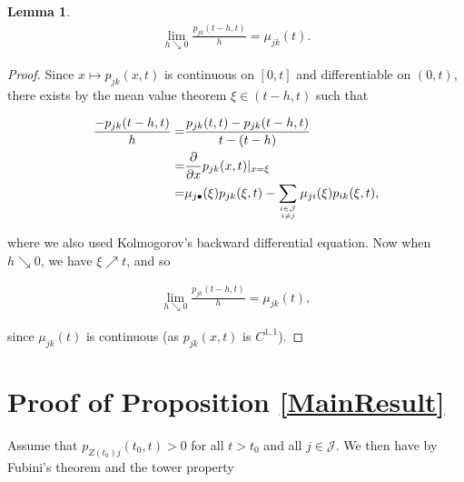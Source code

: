 \documentclass{article}
\newcommand{\1}[1]{\mathbbm{1}_{\left\lbrace #1 \right\rbrace}}
\theoremstyle{break}
\newtheorem{lemma}[definition]{Lemma}
\theoremstyle{remark}
\numberwithin{equation}{section}
\begin{document}
\begin{appendices}
\begin{lemma}
	\begin{align*}
		\lim_{h \searrow 0} \frac{p_{jk}(t-h,t)}{h} = \mu_{jk}(t).
	\end{align*}
\end{lemma}
\begin{proof}
	Since $x \mapsto p_{jk}(x,t)$ is continuous on $[0,t]$ and differentiable on $(0,t)$, there exists by the mean value theorem $\xi \in ( t-h, t)$ such that
	
	\begin{align*}
		\frac{-p_{jk}(t-h,t)}{h} =& \frac{p_{jk}(t,t)-p_{jk}(t-h,t)}{t-(t-h)} \\
		=& \frac{\partial}{\partial x} p_{jk}(x,t)|_{x=\xi} \\
		=& \mu_{j \bullet}(\xi) p_{jk}(\xi,t) - \sum_{i \in \mathcal{J} \atop i \neq j} \mu_{ji}(\xi) p_{ik}(\xi,t),
	\end{align*}
	
	where we also used Kolmogorov's backward differential equation. Now when $h \searrow 0$, we have $\xi \nearrow t$, and so
	
	\begin{align*}
		\lim_{h \searrow 0} \frac{p_{jk}(t-h,t)}{h} = \mu_{jk}(t),
	\end{align*}
	
	since $\mu_{jk}(t)$ is continuous (as $p_{jk}(x,t)$ is $C^{1,1}$).
\end{proof}

\newpage

\section{Proof of Proposition \ref{MainResult}} \label{MainProof}

Assume that $p_{Z(t_0)j}(t_0,t)>0$ for all $t>t_0$ and all $j \in \mathcal{J}$. We then have by Fubini's theorem and the tower property


\end{appendices}
\end{document}
